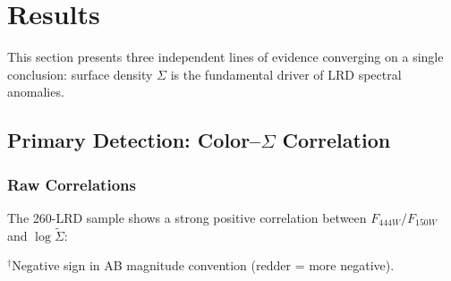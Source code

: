 \documentclass[apj,twocolumn,longbibliography,linenumbers]{aastex701}
\begin{document}


\section{Results}

This section presents three independent lines of evidence converging on a single conclusion: surface density $\Sigma$ is the fundamental driver of LRD spectral anomalies.

\subsection{Primary Detection: Color--$\Sigma$ Correlation}

\subsubsection{Raw Correlations}

The 260-LRD sample shows a strong positive correlation between $F_{444W}/F_{150W}$ and $\log\tilde\Sigma$:

\begin{table}[h]
\caption{Raw Statistical Tests for Color--$\Sigma$ Correlation}
\label{tab:raw_stats}
\centering
\small
{}
$^{\dagger}$Negative sign in AB magnitude convention (redder = more negative).
\end{table}
\end{document}

